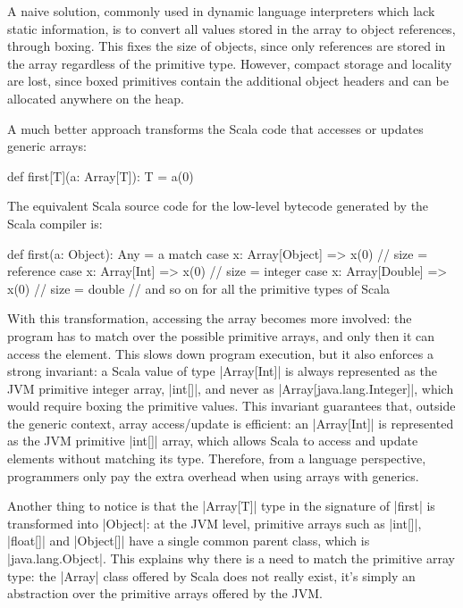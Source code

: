 A naive solution, commonly used in dynamic language interpreters which lack static information, is to convert all values stored in the array to object references, through boxing. This fixes the size of objects, since only references are stored in the array regardless of the primitive type. However, compact storage and locality are lost, since boxed primitives contain the additional object headers and can be allocated anywhere on the heap.

A much better approach transforms the Scala code that accesses or updates generic arrays:

\begin{lstlisting-nobreak}
 def first[T](a: Array[T]): T = a(0)
\end{lstlisting-nobreak}

The equivalent Scala source code for the low-level bytecode generated by the Scala compiler is:

\begin{lstlisting-nobreak}
 def first(a: Object): Any =
   a match {
     case x: Array[Object] => x(0) // size = reference
     case x: Array[Int]    => x(0) // size = integer
     case x: Array[Double] => x(0) // size = double
     // and so on for all the primitive types of Scala
   }
\end{lstlisting-nobreak}


With this transformation, accessing the array becomes more involved: the program has to match over the possible primitive arrays, and only then it can access the element. This slows down program execution, but it also enforces a strong invariant: a Scala value of type |Array[Int]| is always represented as the JVM primitive integer array, |int[]|, and never as |Array[java.lang.Integer]|, which would require boxing the primitive values. This invariant guarantees that, outside the generic context, array access/update is efficient: an |Array[Int]| is represented as the JVM primitive |int[]| array, which allows Scala to access and update elements without matching its type. Therefore, from a language perspective, programmers only pay the extra overhead when using arrays with generics.

Another thing to notice is that the |Array[T]| type in the signature of |first| is transformed into |Object|: at the JVM level, primitive arrays such as |int[]|, |float[]| and |Object[]| have a single common parent class, which is |java.lang.Object|. This explains why there is a need to match the primitive array type: the |Array| class offered by Scala does not really exist, it's simply an abstraction over the primitive arrays offered by the JVM.

